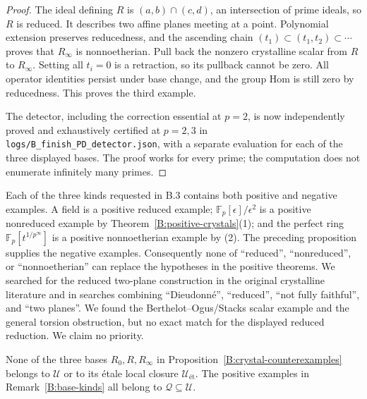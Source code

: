 \begin{proof}
The ideal defining $R$ is $(a,b)\cap(c,d)$, an intersection of
prime ideals, so $R$ is reduced. It describes two affine planes
meeting at a point. Polynomial extension preserves reducedness,
and the ascending chain $(t_1)\subset(t_1,t_2)\subset\cdots$
proves that $R_\infty$ is nonnoetherian. Pull back the nonzero
crystalline scalar from $R$ to $R_\infty$. Setting all $t_i=0$
is a retraction, so its pullback cannot be zero. All operator
identities persist under base change, and the group Hom is still
zero by reducedness. This proves the third example.

The detector, including the correction essential at $p=2$, is now
independently proved and exhaustively certified at $p=2,3$ in
\texttt{logs/B\_finish\_PD\_detector.json}, with a separate
evaluation for each of the three displayed bases. The proof works
for every prime; the computation does not enumerate infinitely many primes.
\end{proof}

\begin{remark}
\label{B:base-kinds}
Each of the three kinds requested in B.3 contains both positive
and negative examples. A field is a positive reduced example;
$\mathbb F_p[\epsilon]/\epsilon^2$ is a positive nonreduced example
by Theorem~\ref{B:positive-crystals}(1); and the perfect ring
$\mathbb F_p[t^{1/p^\infty}]$ is a positive nonnoetherian example
by (2). The preceding proposition supplies the negative examples.
Consequently none of ``reduced'', ``nonreduced'', or
``nonnoetherian'' can replace the hypotheses in the positive
theorems. We searched for the reduced two-plane construction in
the original crystalline literature and in searches combining
``Dieudonn\'e'', ``reduced'', ``not fully faithful'', and
``two planes''. We found the Berthelot--Ogus/Stacks scalar example
and the general torsion obstruction, but no exact match for the
displayed reduced reduction. We claim no priority.
\end{remark}

\begin{proposition}
\label{B:positive-exclusion}
None of the three bases $R_0,R,R_\infty$ in
Proposition~\ref{B:crystal-counterexamples} belongs to $\mathcal U$
or to its \'etale local closure $\mathcal U_{\text{ét}}$.
The positive examples in Remark~\ref{B:base-kinds} all belong to
$\mathcal Q\subseteq\mathcal U$.
\end{proposition}

